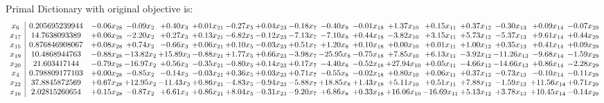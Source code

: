 \documentclass[9pt]{article}
\begin{document}
Primal Dictionary with original objective is:
\[\begin{array}{c| c c@{\hskip 2pt} c@{\hskip 2pt} c@{\hskip 2pt} c@{\hskip 2pt} c@{\hskip 2pt} c@{\hskip 2pt} c@{\hskip 2pt} c@{\hskip 2pt} c@{\hskip 2pt} c@{\hskip 2pt} c@{\hskip 2pt} c@{\hskip 2pt} c@{\hskip 2pt} c@{\hskip 2pt} c@{\hskip 2pt} }
 x_{6}   &  0.205695239944 & -0.06 x_{28} & -0.09 x_{2} & +  0.40 x_{3} & +  0.01 x_{21} & -0.27 x_{5} & +  0.04 x_{23} & -0.18 x_{7} & -0.40 x_{8} & -0.01 x_{18} & +  1.37 x_{10} & +  0.15 x_{11} & +  0.37 x_{12} & -0.30 x_{13} & +  0.09 x_{14} & -0.07 x_{29}\\
 x_{17}   &  14.7638093389 & +  0.06 x_{28} & -2.20 x_{2} & +  0.27 x_{3} & +  0.13 x_{21} & -6.82 x_{5} & -0.12 x_{23} & -7.13 x_{7} & -7.10 x_{8} & +  0.44 x_{18} & -3.82 x_{10} & +  3.15 x_{11} & +  5.73 x_{12} & -5.37 x_{13} & +  9.61 x_{14} & +  0.44 x_{29}\\
 x_{15}   &  0.876846908067 & +  0.08 x_{28} & +  0.74 x_{2} & -0.66 x_{3} & +  0.06 x_{21} & +  0.10 x_{5} & -0.03 x_{23} & +  0.51 x_{7} & +  1.20 x_{8} & +  0.10 x_{18} & +  0.00 x_{10} & +  0.01 x_{11} & +  1.00 x_{12} & +  0.35 x_{13} & +  0.41 x_{14} & +  0.09 x_{29}\\
 x_{19}   &  10.4868944763 & -0.88 x_{28} & -13.82 x_{2} & + 15.89 x_{3} & -0.88 x_{21} & +  1.77 x_{5} & +  0.66 x_{23} & -3.98 x_{7} & -25.95 x_{8} & -0.75 x_{18} & +  7.85 x_{10} & +  6.13 x_{11} & -3.92 x_{12} & -11.26 x_{13} & -9.68 x_{14} & -1.59 x_{29}\\
 x_{20}   &  21.603417144 & -0.79 x_{28} & -16.97 x_{2} & +  0.56 x_{3} & -0.35 x_{21} & -0.80 x_{5} & +  0.14 x_{23} & +  0.17 x_{7} & -4.40 x_{8} & -0.52 x_{18} & + 27.94 x_{10} & +  0.05 x_{11} & -4.66 x_{12} & -14.66 x_{13} & +  0.86 x_{14} & -2.28 x_{29}\\
 x_{4}   &  0.798809177103 & +  0.00 x_{28} & -0.85 x_{2} & -0.14 x_{3} & -0.03 x_{21} & +  0.36 x_{5} & +  0.03 x_{23} & +  0.71 x_{7} & -0.55 x_{8} & -0.02 x_{18} & +  0.80 x_{10} & +  0.06 x_{11} & +  0.37 x_{12} & -0.73 x_{13} & -0.10 x_{14} & -0.11 x_{29}\\
 x_{22}   &  37.8845872569 & +  0.67 x_{28} & + 12.95 x_{2} & -11.43 x_{3} & +  0.86 x_{21} & -4.83 x_{5} & -0.94 x_{23} & -5.88 x_{7} & + 18.85 x_{8} & +  1.43 x_{18} & +  5.11 x_{10} & +  0.51 x_{11} & +  7.88 x_{12} & -1.59 x_{13} & + 11.56 x_{14} & +  0.71 x_{29}\\
 x_{16}   &  2.02815260654 & +  0.15 x_{28} & -0.87 x_{2} & +  6.61 x_{3} & +  0.86 x_{21} & +  8.04 x_{5} & -0.31 x_{23} & -9.20 x_{7} & +  6.86 x_{8} & +  0.33 x_{18} & + 16.06 x_{10} & -16.69 x_{11} & +  5.13 x_{12} & +  3.78 x_{13} & + 10.45 x_{14} & -0.14 x_{29}\\

\end{array}\]
\end{document}
